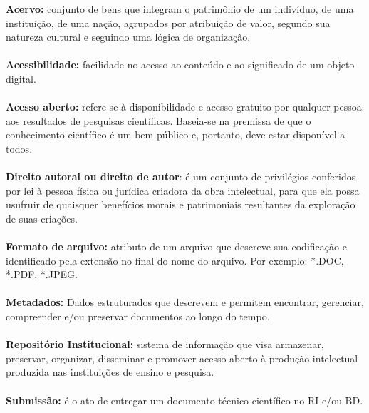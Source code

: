 \documentclass[
  12pt,		%
  a4paper,	%
  openright,  %
  oneside,	%
  chapter=TITLE,		%
  section=TITLE,		%
  english,	%
  french,	    %
  spanish,	%
  brazil	    %
]{abntex2}
\begin{document}
    \noindent\textbf{Acervo:} conjunto de bens que integram o patrimônio de um indivíduo, de uma instituição, de uma nação, agrupados por atribuição de valor, segundo sua natureza cultural e seguindo uma lógica de organização.\\ \\
\textbf{Acessibilidade:} facilidade no acesso ao conteúdo e ao significado de um objeto digital.\\ \\
\textbf{Acesso aberto:}  refere-se à disponibilidade e acesso gratuito por qualquer pessoa aos resultados de pesquisas científicas. Baseia-se na premissa de que o conhecimento científico é um bem público e, portanto, deve estar disponível a todos.\\ \\
\textbf {Direito autoral ou direito de autor}: é um conjunto de privilégios conferidos por lei à pessoa física ou jurídica criadora da obra intelectual, para que ela possa usufruir de quaisquer benefícios morais e patrimoniais resultantes da exploração de suas criações.\\ \\
\textbf {Formato de arquivo:} atributo de um arquivo que descreve sua codificação e identificado pela extensão no final do nome do arquivo. Por exemplo: *.DOC, *.PDF, *.JPEG.\\ \\
\textbf {Metadados:} Dados estruturados que descrevem e permitem encontrar, gerenciar, compreender e/ou preservar documentos ao longo do tempo.\\ \\
\textbf {Repositório Institucional:} sistema de informação que visa armazenar, preservar, organizar, disseminar e promover acesso aberto à produção intelectual produzida nas instituições de ensino e pesquisa.\\ \\
\textbf {Submissão:} é o ato de entregar um documento técnico-científico no RI e/ou BD.
    

\end{document}
